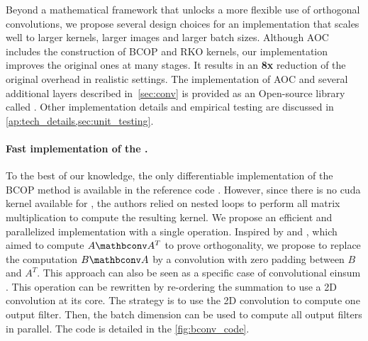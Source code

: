 \label{sec:implem}
Beyond a mathematical framework that unlocks a more flexible use of orthogonal convolutions, we propose several design choices for an implementation that scales well to larger kernels, larger images and larger batch sizes. Although AOC includes the construction of BCOP and RKO kernels, our implementation improves the original ones at many stages. It results in an \textbf{8x} reduction of the original overhead in realistic settings. The implementation of AOC and several additional layers described in~\cref{sec:conv} is provided as an Open-source library called \fulllibname. 
Other implementation details and empirical testing are discussed in \cref{ap:tech_details,sec:unit_testing}.


\vspace{-1mm}\paragraph{Fast implementation of the \Bconv.}\label{subsec:bconv_implem}

    To the best of our knowledge, the only differentiable implementation of the BCOP method is available in the reference code \cite{li_preventing_2019}. However, since there is no cuda kernel available for \Bconv, the authors relied on nested loops to perform all matrix multiplication to compute the resulting kernel. %
    We propose an efficient and parallelized implementation with a single operation. %
    Inspired by \cite{wang_orthogonal_2020} and \cite{delattre2023efficient}, which aimed to compute $A\mathbconv A^T$ to prove orthogonality, we propose to replace the computation $B\mathbconv A$  by a convolution with zero padding between $B$ and $A^T$. This approach can also be seen as a specific case of convolutional einsum \cite{rabbani2024conv_einsum}.
    This operation can be rewritten by re-ordering the summation to use a 2D convolution at its core. The strategy is to use the 2D convolution to compute one output filter. Then, the batch dimension can be used to compute all output filters in parallel. The code is detailed in the \cref{fig:bconv_code}.

